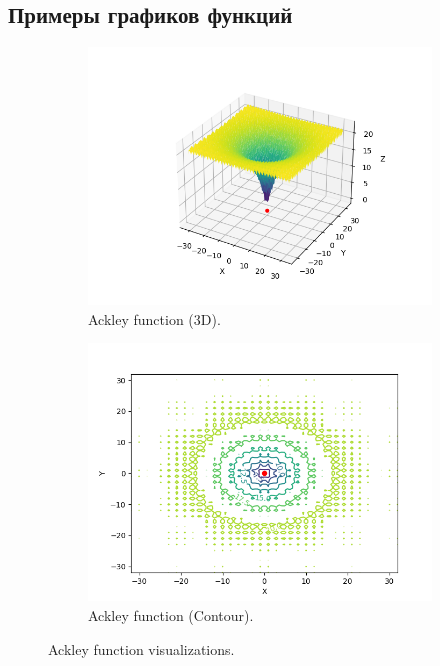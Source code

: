 \documentclass[a4paper,12pt]{article}
\begin{document}
\subsection{Примеры графиков функций}

\begin{figure}[h!]
    \centering
    \begin{subfigure}[b]{0.45\textwidth}
        \centering
        \includegraphics[width=\textwidth]{images/ackley_3d.png}
        \caption{Ackley function (3D).}
        \label{fig:ackley_3d}
    \end{subfigure}
    \hfill
    \begin{subfigure}[b]{0.45\textwidth}
        \centering
        \includegraphics[width=\textwidth]{images/ackley_contour.png}
        \caption{Ackley function (Contour).}
        \label{fig:ackley_contour}
    \end{subfigure}
    \caption{Ackley function visualizations.}
    \label{fig:ackley}
\end{figure}
\end{document}
